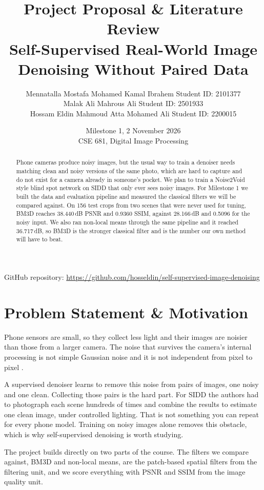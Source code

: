 \documentclass[11pt]{article}
\title{\LARGE Project Proposal \& Literature Review \\[4pt]
\large Self-Supervised Real-World Image Denoising Without Paired Data}
\author{
  \normalsize Mennatalla Mostafa Mohamed Kamal Ibrahem \textbar{} Student ID: 2101377 \\
  \normalsize Malak Ali Mahrous Ali \textbar{} Student ID: 2501933 \\
  \normalsize Hossam Eldin Mahmoud Atta Mohamed Ali \textbar{} Student ID: 2200015
}
\date{Milestone 1, 2 November 2026 \\{} CSE 681, Digital Image Processing}
\begin{document}
\maketitle
\begin{center}
GitHub repository: \url{https://github.com/hosseldin/self-supervised-image-denoising}
\end{center}

\begin{abstract}
Phone cameras produce noisy images, but the usual way to train a denoiser needs matching
clean and noisy versions of the same photo, which are hard to capture and do not exist for
a camera already in someone's pocket. We plan to train a Noise2Void style blind spot
network on SIDD that only ever sees noisy images. For Milestone 1 we built the data and
evaluation pipeline and measured the classical filters we will be compared against. On 156
test crops from two scenes that were never used for tuning, BM3D reaches 38.440\,dB PSNR
and 0.9360 SSIM, against 28.166\,dB and 0.5096 for the noisy input. We also ran non-local
means through the same pipeline and it reached 36.717\,dB, so BM3D is the stronger
classical filter and is the number our own method will have to beat.
\end{abstract}

\section{Problem Statement \& Motivation}
\label{sec:motivation}
Phone sensors are small, so they collect less light and their images are noisier than
those from a larger camera. The noise that survives the camera's internal processing is
not simple Gaussian noise and it is not independent from pixel to pixel
\citep{abdelhamed2018sidd}.

A supervised denoiser learns to remove this noise from pairs of images, one noisy and one
clean. Collecting those pairs is the hard part. For SIDD the authors had to photograph
each scene hundreds of times and combine the results to estimate one clean image, under
controlled lighting. That is not something you can repeat for every phone model. Training
on noisy images alone removes this obstacle, which is why self-supervised denoising is
worth studying.

The project builds directly on two parts of the course. The filters we compare against,
BM3D and non-local means, are the patch-based spatial filters from the filtering unit, and
we score everything with PSNR and SSIM from the image quality unit.
\end{document}

